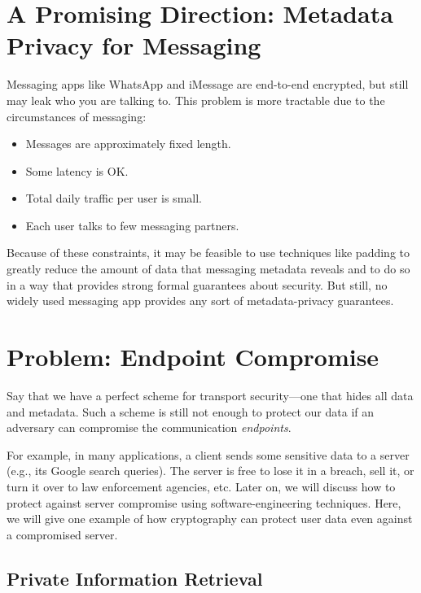 \documentclass[
  letterpaper,
]{scrbook}
\providecommand{\tightlist}{%
  \setlength{\itemsep}{0pt}\setlength{\parskip}{0pt}}
\theoremstyle{definition}
\theoremstyle{plain}
\theoremstyle{plain}
\theoremstyle{remark}
\begin{document}
\section{A Promising Direction: Metadata Privacy for
Messaging}\label{a-promising-direction-metadata-privacy-for-messaging}

Messaging apps like WhatsApp and iMessage are end-to-end encrypted, but
still may leak who you are talking to. This problem is more tractable
due to the circumstances of messaging:

\begin{itemize}
\tightlist
\item
  Messages are approximately fixed length.
\item
  Some latency is OK.
\item
  Total daily traffic per user is small.
\item
  Each user talks to few messaging partners.
\end{itemize}

Because of these constraints, it may be feasible to use techniques like
padding to greatly reduce the amount of data that messaging metadata
reveals and to do so in a way that provides strong formal guarantees
about security. But still, no widely used messaging app provides any
sort of metadata-privacy guarantees.

\section{Problem: Endpoint
Compromise}\label{problem-endpoint-compromise}

Say that we have a perfect scheme for transport security---one that
hides all data and metadata. Such a scheme is still not enough to
protect our data if an adversary can compromise the communication
\emph{endpoints}.

For example, in many applications, a client sends some sensitive data to
a server (e.g., its Google search queries). The server is free to lose
it in a breach, sell it, or turn it over to law enforcement agencies,
etc. Later on, we will discuss how to protect against server compromise
using software-engineering techniques. Here, we will give one example of
how cryptography can protect user data even against a compromised
server.

\subsection{Private Information
Retrieval}\label{private-information-retrieval}
\end{document}
